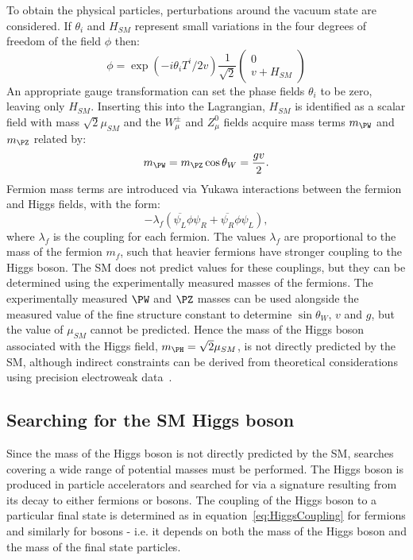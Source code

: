To obtain the physical particles, perturbations around the vacuum state are
considered. If $\theta_{i}$ and $H_{SM}$ represent small variations in the four
degrees of freedom of the field $\phi$ then:
\begin{equation}
\phi = \exp(-i\theta_{i}T^{i}/2v)\frac{1}{\sqrt{2}}\begin{pmatrix} 0 \\ v+H_{SM} \end{pmatrix}
\end{equation}
An appropriate gauge transformation can set the phase fields $\theta_{i}$ to be
zero, leaving only $H_{SM}$. Inserting this into the Lagrangian, $H_{SM}$ is
identified as a scalar field with mass $\sqrt{2}\mu_{SM}$ and the $W_{\mu}^{\pm}$
and $Z_{\mu}^{0}$ fields acquire mass terms $m_{\PW}$ and $m_{\PZ}$ related by:
\begin{equation}
m_{\PW} = m_{\PZ}\cos{\theta_{W}}=\frac{gv}{2}.
\label{eq:vaccummw}
\end{equation}
Fermion mass terms are introduced via Yukawa interactions between the fermion
and Higgs fields, with the form:
\begin{equation}
-\lambda_{f}( \overline{\psi_{L}}\phi\psi_{R} +
\overline{\psi_{R}}\phi\psi_{L}),  
\label{eq:HiggsCoupling}
\end{equation}
where $\lambda_{f}$ is the coupling for each fermion. The values $\lambda_{f}$ 
are proportional to the mass of the fermion $m_{f}$, such that heavier fermions have stronger
coupling to the Higgs boson. The \ac{SM} does not predict values for these
couplings, but they can be determined using the experimentally measured masses
of the fermions. The experimentally measured $\PW$ and $\PZ$ masses can be used
alongside the measured value of the fine structure constant to determine
$\sin{\theta_{W}}$, $v$ and $g$, but the value of $\mu_{SM}$ cannot be
predicted. Hence the mass of the Higgs boson associated with the Higgs field,
$m_{\PH}=\sqrt{2}\mu_{SM}$, is not directly predicted by the \ac{SM}, although 
indirect constraints can be derived from theoretical considerations using
precision electroweak data~\cite{lepewwg}.

\subsection{Searching for the SM Higgs boson}
\label{sec:LHCSMHiggs}

Since the mass of the Higgs boson is not directly predicted by the \ac{SM},
searches covering a wide range of potential masses must be performed.
The Higgs boson is produced in particle accelerators and searched for via a signature 
resulting from its decay to either fermions or bosons. The coupling of the
Higgs boson to a particular final state is determined as in
equation~\ref{eq:HiggsCoupling} for fermions and similarly for bosons - i.e. it
depends on both the mass of the Higgs boson and the mass of the final state
particles. 

